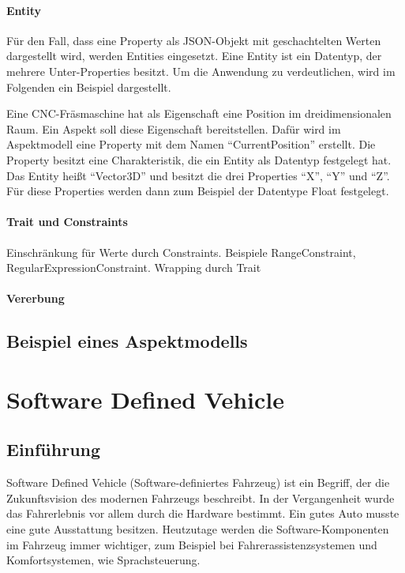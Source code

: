 		\paragraph{Entity} Für den Fall, dass eine Property als JSON-Objekt mit geschachtelten Werten dargestellt wird, werden Entities eingesetzt. Eine Entity ist ein Datentyp, der mehrere Unter-Properties besitzt. Um die Anwendung zu verdeutlichen, wird im Folgenden ein Beispiel dargestellt.
		
		Eine CNC-Fräsmaschine hat als Eigenschaft eine Position im dreidimensionalen Raum. Ein Aspekt soll diese Eigenschaft bereitstellen. Dafür wird im Aspektmodell eine Property mit dem Namen "`CurrentPosition"' erstellt. Die Property besitzt eine Charakteristik, die ein Entity als Datentyp festgelegt hat. Das Entity heißt "`Vector3D"' und besitzt die drei Properties "`X"', "`Y"' und "`Z"'. Für diese Properties werden dann zum Beispiel der Datentype Float festgelegt.
		
		\paragraph{Trait und Constraints}
		{\color{red} Einschränkung für Werte durch Constraints. Beispiele RangeConstraint, RegularExpressionConstraint. Wrapping durch Trait}
		\paragraph{Vererbung}

	\subsection{Beispiel eines Aspektmodells}

\section{Software Defined Vehicle}

	\subsection{Einführung}
	Software Defined Vehicle (Software-definiertes Fahrzeug) ist ein Begriff, der die Zukunftsvision des modernen Fahrzeugs beschreibt. In der Vergangenheit wurde das Fahrerlebnis vor allem durch die Hardware bestimmt. Ein gutes Auto musste eine gute Ausstattung besitzen. Heutzutage werden die Software-Komponenten im Fahrzeug immer wichtiger, zum Beispiel bei Fahrerassistenzsystemen und Komfortsystemen, wie Sprachsteuerung.
	
